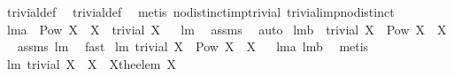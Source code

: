 \begin{isabellebody}
\ trivial{\isacharunderscore}def\ \isamarkupfalse%
\ trivial{\isacharunderscore}def\ \isanewline
{}\isamarkupfalse%
\ {\isacharparenleft}metis\ no{\isacharunderscore}distinct{\isacharunderscore}imp{\isacharunderscore}trivial\ trivial{\isacharunderscore}imp{\isacharunderscore}no{\isacharunderscore}distinct{\isacharparenright}%
\endisatagproof
{\isafoldproof}%
%
\isadelimproof
%
\endisadelimproof
\isanewline
\isanewline
{}\isamarkupfalse%
\ lm{}{}{}a{\isacharcolon}\ \ {\isachardoublequoteopen}{\isacharparenleft}Pow\ X\ {\isasymsubseteq}\ {\isacharbraceleft}{\isacharbraceleft}{\isacharbraceright}{\isacharcomma}X{\isacharbraceright}{\isacharparenright}{\isachardoublequoteclose}\ \ {\isachardoublequoteopen}trivial\ X{\isachardoublequoteclose}%
\isadelimproof
\ %
\endisadelimproof
%
\isatagproof
{}\isamarkupfalse%
\ lm{}{}\ \isamarkupfalse%
\ assms\ \isamarkupfalse%
\ auto%
\endisatagproof
{\isafoldproof}%
%
\isadelimproof
%
\endisadelimproof
\isanewline
\isanewline
{}\isamarkupfalse%
\ lm{}{}{}b{\isacharcolon}\ \ {\isachardoublequoteopen}trivial\ X{\isachardoublequoteclose}\ \ {\isachardoublequoteopen}{\isacharparenleft}Pow\ X\ {\isasymsubseteq}\ {\isacharbraceleft}{\isacharbraceleft}{\isacharbraceright}{\isacharcomma}X{\isacharbraceright}{\isacharparenright}{\isachardoublequoteclose}%
\isadelimproof
\ %
\endisadelimproof
%
\isatagproof
{}\isamarkupfalse%
\ assms\ lm{}{}\ \isamarkupfalse%
\ fast%
\endisatagproof
{\isafoldproof}%
%
\isadelimproof
%
\endisadelimproof
\isanewline
\isanewline
{}\isamarkupfalse%
\ lm{}{}{}{\isacharcolon}\ {\isachardoublequoteopen}trivial\ X\ {\isacharequal}\ {\isacharparenleft}Pow\ X\ {\isasymsubseteq}\ {\isacharbraceleft}{\isacharbraceleft}{\isacharbraceright}{\isacharcomma}X{\isacharbraceright}{\isacharparenright}{\isachardoublequoteclose}%
\isadelimproof
\ %
\endisadelimproof
%
\isatagproof
{}\isamarkupfalse%
\ lm{}{}{}a\ lm{}{}{}b\ \isamarkupfalse%
\ metis%
\endisatagproof
{\isafoldproof}%
%
\isadelimproof
%
\endisadelimproof
\isanewline
\isanewline
{}\isamarkupfalse%
\ lm{}{}{}{\isacharcolon}\ {\isachardoublequoteopen}trivial\ X\ {\isacharequal}\ {\isacharparenleft}X{\isacharequal}{\isacharbraceleft}{\isacharbraceright}\ {\isasymor}\ X{\isacharequal}{\isacharbraceleft}the{\isacharunderscore}elem\ X{\isacharbraceright}{\isacharparenright}{\isachardoublequoteclose}\ \isanewline

\end{isabellebody}
